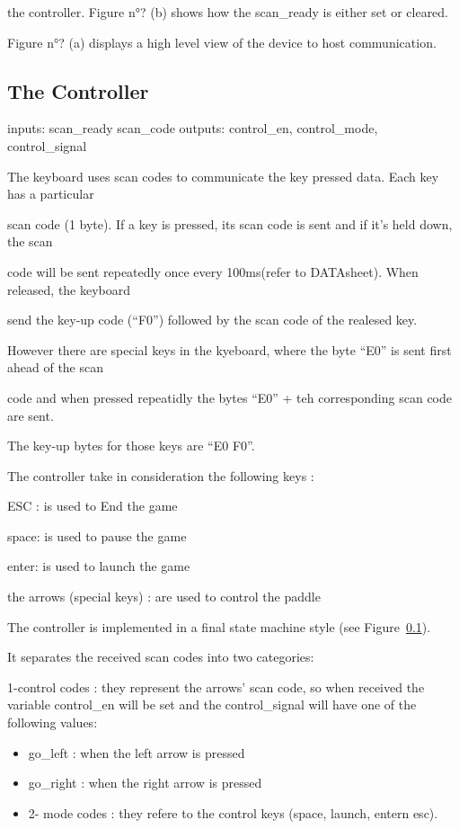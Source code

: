 \documentclass[conference]{IEEEtran}
\begin{document}
the controller. Figure n°? (b) shows how the scan_ready is either set or cleared.



Figure n°? (a) displays a high level view of the device to host communication.


\subsection{The Controller}

inputs: scan_ready scan_code outputs: control_en, control_mode, control_signal



The keyboard uses scan codes to communicate the key pressed data. Each key has a particular

scan code (1 byte). If a key is pressed, its scan code is sent and if it's held down, the scan

code will be sent repeatedly once every 100ms(refer to DATAsheet). When released, the keyboard

send the key-up code (``F0'') followed by the scan code of the realesed key.



However there are special keys in the kyeboard, where the byte ``E0'' is sent first ahead of the scan

code and when pressed repeatidly the bytes ``E0'' + teh corresponding scan code are sent.

The key-up bytes for those keys are ``E0 F0''.



The controller take in consideration the following keys :

ESC : is used to End the game

space: is used to pause the game

enter: is used to launch the game

the arrows (special keys) : are used to control the paddle



The controller is implemented in a final state machine style (see Figure~\ref{}).

It separates the received scan codes into two categories:



1-control codes : they represent the arrows' scan code, so when received the variable control\_en will be set and the control\_signal will have one of the following values:

\begin{itemize}
\item go\_left : when the left arrow is pressed
\item go\_right : when the right arrow is pressed
\item 2- mode codes : they refere to the control keys (space, launch, entern esc).
\end{itemize}
\end{document}
